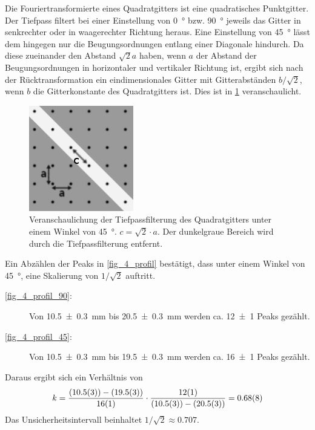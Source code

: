 \documentclass[
	a4paper,
	12pt,
	pagesize,
	ngerman
]{scrartcl}
\begin{document}
	Die Fouriertransformierte eines Quadratgitters ist eine quadratisches Punktgitter.
	Der Tiefpass filtert bei einer Einstellung von \SI{0}{\degree} bzw. \SI{90}{\degree} jeweils das Gitter in senkrechter oder in waagerechter Richtung heraus.
	Eine Einstellung von \SI{45}{\degree} lässt dem hingegen nur die Beugungsordnungen entlang einer Diagonale hindurch.
	Da diese zueinander den Abstand $\sqrt{2}a$ haben, wenn $a$ der Abstand der Beugungsordnungen in horizontaler und vertikaler Richtung ist, ergibt sich nach der Rücktransformation ein eindimensionales Gitter mit Gitterabständen $b/\sqrt{2}$, wenn $b$ die Gitterkonstante des Quadratgitters ist.
	Dies ist in \cref{fig_matrix} veranschaulicht.
	\begin{figure}[H]
			\includegraphics[width=0.5\linewidth]{img/matrix}
			\caption{
				Veranschaulichung der Tiefpassfilterung des Quadratgitters unter einem Winkel von \SI{45}{\degree}. $c=\sqrt{2} \cdot a$. Der dunkelgraue Bereich wird durch die Tiefpassfilterung entfernt.
			}
			\label{fig_matrix}
	\end{figure}
	Ein Abzählen der Peaks in \cref{fig_4_profil} bestätigt, dass unter einem Winkel von \SI{45}{\degree}, eine Skalierung von $1/\sqrt{2}$ auftritt.
	\begin{description}
		\item[\cref{fig_4_profil_90}:] Von \SI{10.5+-0.3}{mm} bis \SI{20.5+-0.3}{mm} werden ca. \SI{12+-1}{} Peaks gezählt.
		\item[\cref{fig_4_profil_45}:] Von \SI{10.5+-0.3}{mm} bis \SI{19.5+-0.3}{mm} werden ca. \SI{16+-1}{} Peaks gezählt.
	\end{description}
	Daraus ergibt sich ein Verhältnis von
	\begin{equation}
			k = \frac{(\SI{10.5+-0.3}{})-(\SI{19.5+-0.3}{})}{\SI{16+-1}{}} \cdot \frac{\SI{12+-1}{}}{(\SI{10.5+-0.3}{})-(\SI{20.5+-0.3}{})} = \SI{0.68+-0.08}{}
	\end{equation}
	Das Unsicherheitsintervall beinhaltet $1/\sqrt{2}\approx \num{0,707}$.
\end{document}
